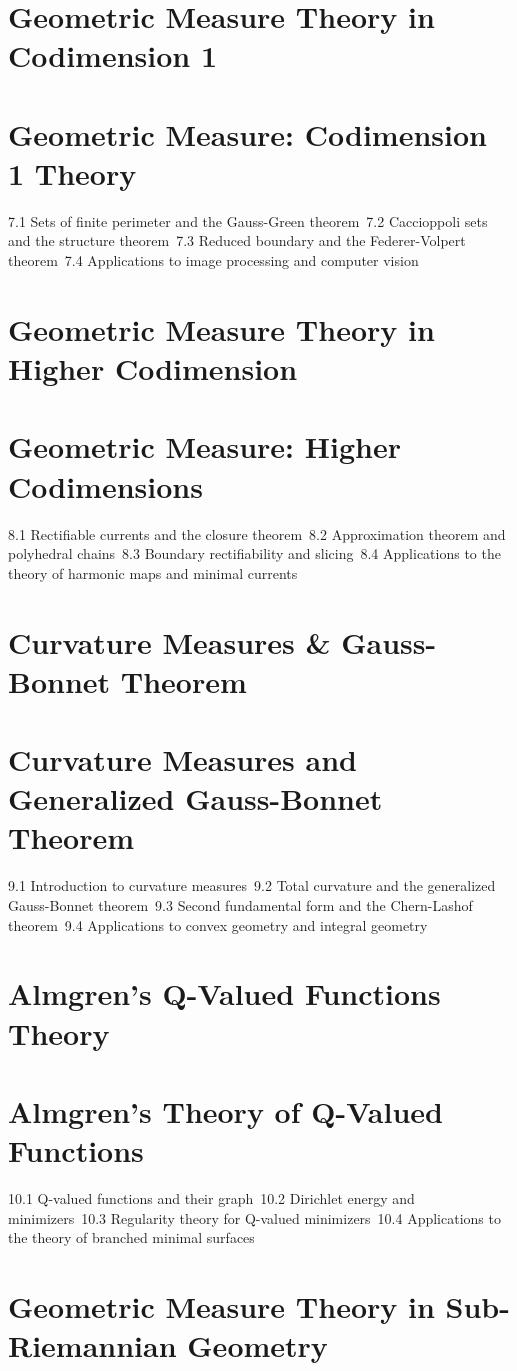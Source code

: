 \section{Geometric Measure Theory in Codimension 1}
\section{Geometric Measure: Codimension 1 Theory}
7.1 Sets of finite perimeter and the Gauss-Green theorem\
7.2 Caccioppoli sets and the structure theorem\
7.3 Reduced boundary and the Federer-Volpert theorem\
7.4 Applications to image processing and computer vision\
\section{Geometric Measure Theory in Higher Codimension}
\section{Geometric Measure: Higher Codimensions}
8.1 Rectifiable currents and the closure theorem\
8.2 Approximation theorem and polyhedral chains\
8.3 Boundary rectifiability and slicing\
8.4 Applications to the theory of harmonic maps and minimal currents\
\section{Curvature Measures \& Gauss-Bonnet Theorem}
\section{Curvature Measures and Generalized Gauss-Bonnet Theorem}
9.1 Introduction to curvature measures\
9.2 Total curvature and the generalized Gauss-Bonnet theorem\
9.3 Second fundamental form and the Chern-Lashof theorem\
9.4 Applications to convex geometry and integral geometry\
\section{Almgren's Q-Valued Functions Theory}
\section{Almgren's Theory of Q-Valued Functions}
10.1 Q-valued functions and their graph\
10.2 Dirichlet energy and minimizers\
10.3 Regularity theory for Q-valued minimizers\
10.4 Applications to the theory of branched minimal surfaces\
\section{Geometric Measure Theory in Sub-Riemannian Geometry}
